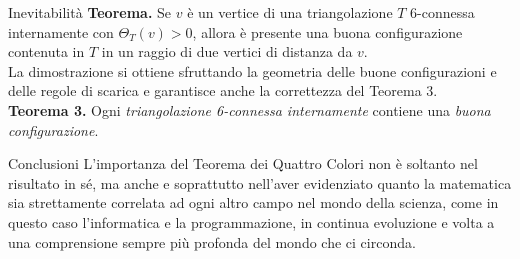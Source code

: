 \documentclass{beamer}
\begin{document}
	\begin{frame}{Inevitabilità}
		\textbf{Teorema.} Se $v$ è un vertice di una triangolazione $T$ 6-connessa internamente con $\Theta_T(v) > 0$, allora è presente una buona configurazione contenuta in $T$ in un raggio di due vertici di distanza da $v$.
		\vspace{0.3cm}
		\\La dimostrazione si ottiene sfruttando la geometria delle buone configurazioni e delle regole di scarica e garantisce anche la correttezza del Teorema 3.
		\vspace{0.3cm}
		\\{\bfseries Teorema 3.} Ogni \emph{triangolazione 6-connessa internamente} contiene una \emph{buona configurazione}.
	\end{frame}
	
	\begin{frame}{Conclusioni}
	    L'importanza del Teorema dei Quattro Colori non è soltanto nel risultato in sé, ma anche e soprattutto nell'aver evidenziato quanto la matematica sia strettamente correlata ad ogni altro campo nel mondo della scienza, come in questo caso l'informatica e la programmazione, in continua evoluzione e volta a una comprensione sempre più profonda del mondo che ci circonda.
		
	\end{frame}
	
\end{document}
